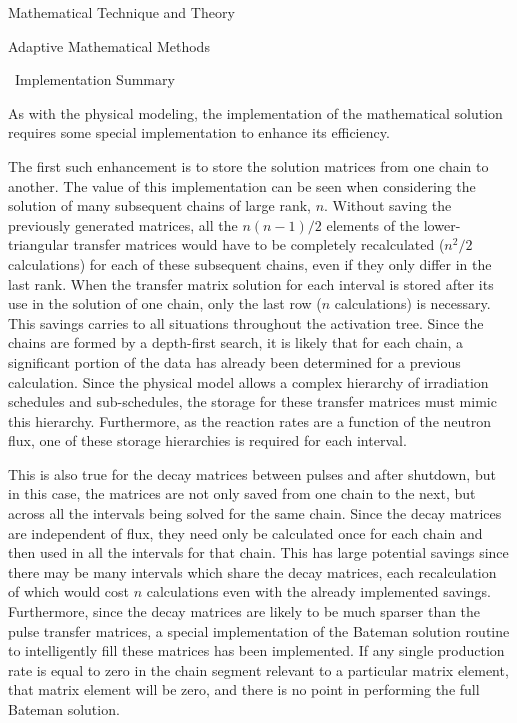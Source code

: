 \begin{chapter}{Mathematical Technique and Theory\label{chap:math}}
\begin{section}{Adaptive Mathematical Methods\label{sec:math.adaptive}}
  \end{section}
  
  \begin{section}{\ALARA\  Implementation Summary}\label{sec:math.implement}
  
    As with the physical modeling, the implementation of the
    mathematical solution requires some special implementation to
    enhance its efficiency.
  
    The first such enhancement is to store the solution matrices from
    one chain to another.  The value of this implementation can be
    seen when considering the solution of many subsequent chains of
    large rank, $n$.  Without saving the previously generated
    matrices, all the $n(n-1)/2$ elements of the lower-triangular
    transfer matrices would have to be completely recalculated
    ($n^2/2$ calculations) for each of these subsequent chains, even
    if they only differ in the last rank.  When the transfer matrix
    solution for each interval is stored after its use in the solution
    of one chain, only the last row ($n$ calculations) is necessary.
    This savings carries to all situations throughout the activation
    tree.  Since the chains are formed by a depth-first search, it is
    likely that for each chain, a significant portion of the data has
    already been determined for a previous calculation.  Since the
    physical model allows a complex hierarchy of irradiation schedules
    and sub-schedules, the storage for these transfer matrices must
    mimic this hierarchy.  Furthermore, as the reaction rates are a
    function of the neutron flux, one of these storage hierarchies is
    required for each interval.
  
    This is also true for the decay matrices between pulses and after
    shutdown, but in this case, the matrices are not only saved from
    one chain to the next, but across all the intervals being solved
    for the same chain.  Since the decay matrices are independent of
    flux, they need only be calculated once for each chain and then
    used in all the intervals for that chain.  This has large
    potential savings since there may be many intervals which share
    the decay matrices, each recalculation of which would cost $n$
    calculations even with the already implemented savings.
    Furthermore, since the decay matrices are likely to be much
    sparser than the pulse transfer matrices, a special implementation
    of the Bateman solution routine to intelligently fill these
    matrices has been implemented.  If any single production rate is
    equal to zero in the chain segment relevant to a particular matrix
    element, that matrix element will be zero, and there is no point
    in performing the full Bateman solution.
  

\end{section}
\end{chapter}
